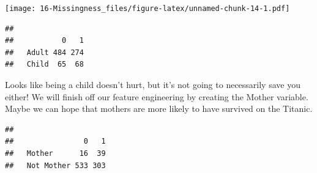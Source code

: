 \documentclass[]{book}
\newenvironment{Shaded}{\begin{snugshade}}{\end{snugshade}}
\newcommand{\KeywordTok}[1]{\textcolor[rgb]{0.13,0.29,0.53}{\textbf{#1}}}
\newcommand{\DecValTok}[1]{\textcolor[rgb]{0.00,0.00,0.81}{#1}}
\newcommand{\StringTok}[1]{\textcolor[rgb]{0.31,0.60,0.02}{#1}}
\newcommand{\CommentTok}[1]{\textcolor[rgb]{0.56,0.35,0.01}{\textit{#1}}}
\newcommand{\OperatorTok}[1]{\textcolor[rgb]{0.81,0.36,0.00}{\textbf{#1}}}
\newcommand{\NormalTok}[1]{#1}
\theoremstyle{definition}
\theoremstyle{definition}
\theoremstyle{definition}
\theoremstyle{remark}
\begin{document}
\texttt{[image: 16-Missingness\_files/figure-latex/unnamed-chunk-14-1.pdf]}

\begin{Shaded}
\end{Shaded}

\begin{verbatim}
##        
##           0   1
##   Adult 484 274
##   Child  65  68
\end{verbatim}

Looks like being a child doesn't hurt, but it's not going to necessarily
save you either! We will finish off our feature engineering by creating
the Mother variable. Maybe we can hope that mothers are more likely to
have survived on the Titanic.

\begin{Shaded}
\end{Shaded}

\begin{verbatim}
##             
##                0   1
##   Mother      16  39
##   Not Mother 533 303
\end{verbatim}
\end{document}
